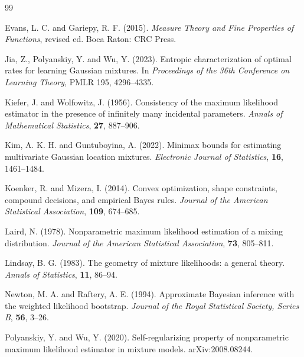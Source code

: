 \documentclass[11pt]{article}
\theoremstyle{definition}
\theoremstyle{remark}
\begin{document}
\begin{thebibliography}{99}

Evans, L. C. and Gariepy, R. F. (2015).
\newblock \emph{Measure Theory and Fine Properties of Functions}, revised ed.
\newblock Boca Raton: CRC Press.

Jia, Z., Polyanskiy, Y. and Wu, Y. (2023).
\newblock Entropic characterization of optimal rates for learning Gaussian
mixtures.
\newblock In \emph{Proceedings of the 36th Conference on Learning Theory},
PMLR 195, 4296--4335.

Kiefer, J. and Wolfowitz, J. (1956).
\newblock Consistency of the maximum likelihood estimator in the presence of
infinitely many incidental parameters.
\newblock \emph{Annals of Mathematical Statistics}, \textbf{27}, 887--906.

Kim, A. K. H. and Guntuboyina, A. (2022).
\newblock Minimax bounds for estimating multivariate Gaussian location
mixtures.
\newblock \emph{Electronic Journal of Statistics}, \textbf{16}, 1461--1484.

Koenker, R. and Mizera, I. (2014).
\newblock Convex optimization, shape constraints, compound decisions, and
empirical Bayes rules.
\newblock \emph{Journal of the American Statistical Association},
\textbf{109}, 674--685.

Laird, N. (1978).
\newblock Nonparametric maximum likelihood estimation of a mixing
distribution.
\newblock \emph{Journal of the American Statistical Association},
\textbf{73}, 805--811.

Lindsay, B. G. (1983).
\newblock The geometry of mixture likelihoods: a general theory.
\newblock \emph{Annals of Statistics}, \textbf{11}, 86--94.

Newton, M. A. and Raftery, A. E. (1994).
\newblock Approximate Bayesian inference with the weighted likelihood
bootstrap.
\newblock \emph{Journal of the Royal Statistical Society, Series B},
\textbf{56}, 3--26.

Polyanskiy, Y. and Wu, Y. (2020).
\newblock Self-regularizing property of nonparametric maximum likelihood
estimator in mixture models.
\newblock arXiv:2008.08244.


\end{thebibliography}
\end{document}
